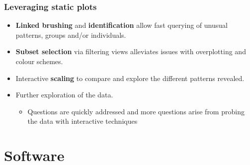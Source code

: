 \documentclass{beamer}
\begin{document}
	\begin{frame}
	\frametitle{Leveraging static plots}
	\begin{itemize}
		\item \textbf{Linked brushing} and \textbf{identification} allow fast querying of unusual patterns, groups and/or individuals.
		\item \textbf{Subset selection} via filtering views alleviates issues with overplotting and colour schemes.
		\item Interactive \textbf{scaling} to compare and explore the different patterns revealed.
		\item Further exploration of the data.
		\begin{itemize}
			\item Questions are quickly addressed and more questions arise from probing the data with interactive techniques
		\end{itemize}
	\end{itemize}
	\end{frame}



\section{Software}
\label{sec:software}
\end{document}
